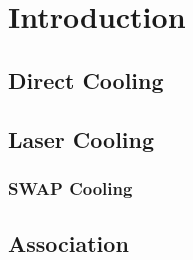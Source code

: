 \ifx\justbeingincluded\undefined


\fi

\chapter{Introduction}
\label{iii}



\section{Direct Cooling}


\section{Laser Cooling}


\subsection{SWAP Cooling}

\section{Association}




\ifx\justbeingincluded\undefined

\fi

